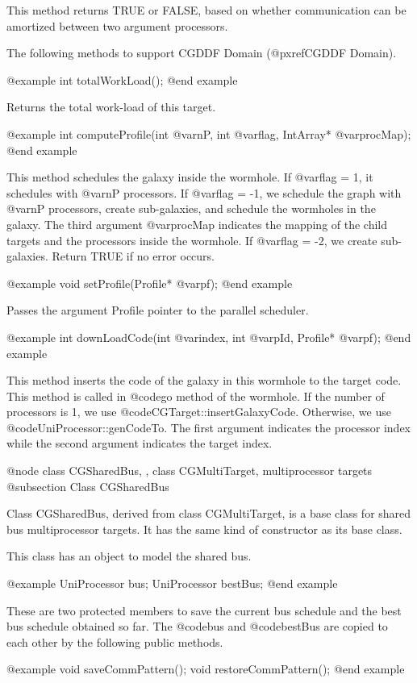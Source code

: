 This method returns TRUE or FALSE, based on whether communication can be
amortized between two argument processors.

The following methods to support CGDDF Domain (@pxref{CGDDF Domain}).

@example
int totalWorkLoad();
@end example

Returns the total work-load of this target.

@example
int computeProfile(int @var{nP}, int @var{flag}, IntArray* @var{procMap});
@end example

This method schedules the galaxy inside the wormhole. If @var{flag} = 1,
it schedules with @var{nP} processors. If @var{flag} = -1, we schedule
the graph with @var{nP} processors, create sub-galaxies, and schedule the
wormholes in the galaxy. The third argument @var{procMap} indicates the 
mapping of the child targets and the processors inside the wormhole.
If @var{flag} = -2, we create sub-galaxies. Return TRUE if no error occurs.

@example
void setProfile(Profile* @var{pf});
@end example

Passes the argument Profile pointer to the parallel scheduler.

@example
int downLoadCode(int @var{index}, int @var{pId}, Profile* @var{pf});
@end example

This method inserts the code of the galaxy in this wormhole to the
target code. This method is called in @code{go} method of the wormhole.
If the number of processors is 1, we use @code{CGTarget::insertGalaxyCode}.
Otherwise, we use @code{UniProcessor::genCodeTo}. The first argument
indicates the processor index while the second argument indicates the
target index.

@node class CGSharedBus, , class CGMultiTarget, multiprocessor targets
@subsection Class CGSharedBus

Class CGSharedBus, derived from class CGMultiTarget, is a base class for
shared bus multiprocessor targets. It has the same kind of constructor as
its base class.

This class has an object to model the shared bus.

@example
UniProcessor bus;
UniProcessor bestBus;
@end example

These are two protected members to save the current bus schedule and the
best bus schedule obtained so far. The @code{bus} and @code{bestBus}
are copied to each other by the following public methods.

@example
void saveCommPattern();
void restoreCommPattern();
@end example

